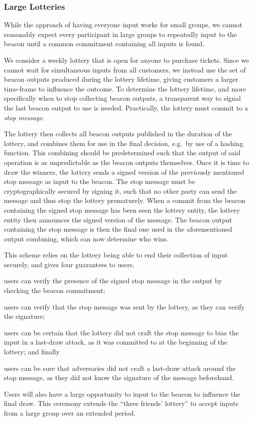 \subsubsection{Large Lotteries}%
\label{ssub:large_lotteries}
While the approach of having everyone input works for small groups, we cannot reasonably expect every participant in large groups to repeatedly input to the beacon until a common commitment containing all inputs is found.

We consider a weekly lottery that is open for anyone to purchase tickets.
Since we cannot wait for simultaneous inputs from all customers, we instead use the set of beacon outputs produced during the lottery lifetime, giving customers a larger time-frame to influence the outcome.
To determine the lottery lifetime, and more specifically when to stop collecting beacon outputs, a transparent way to signal the last beacon output to use is needed.
Practically, the lottery must commit to a \textit{stop message}.

The lottery then collects all beacon outputs published in the duration of the lottery, and combines them for use in the final decision, e.g.\ by use of a hashing function.
This combining should be predetermined such that the output of said operation is as unpredictable as the beacon outputs themselves.
Once it is time to draw the winners, the lottery sends a signed version of the previously mentioned stop message as input to the beacon.
The stop message must be cryptographically secured by signing it, such that no other party can send the message and thus stop the lottery prematurely.
When a commit from the beacon containing the signed stop message has been seen the lottery entity, the lottery entity then announces the signed version of the message.
The beacon output containing the stop message is then the final one used in the aforementioned output combining, which can now determine who wins.

This scheme relies on the lottery being able to end their collection of input securely, and gives four guarantees to users.
\begin{enumberate*}
\item users can verify the presence of the signed stop message in the output by checking the beacon commitment;
\item users can verify that the stop message was sent by the lottery, as they can verify the signature;
\item users can be certain that the lottery did not craft the stop message to bias the input in a last-draw attack, as it was committed to at the beginning of the lottery; and finally
\item users can be sure that adversaries did not craft a last-draw attack around the stop message, as they did not know the signature of the message beforehand.
\end{enumberate*}

Users will also have a large opportunity to input to the beacon to influence the final draw.
This ceremony extends the \enquote{three friends' lottery} to accept inputs from a large group over an extended period.
